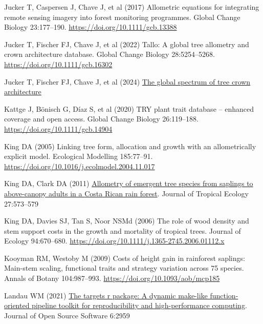 \documentclass[
  12pt,
  letterpaper,
  DIV=11,
  numbers=noendperiod]{scrartcl}
\newlength{\cslhangindent}
\newlength{\cslentryspacingunit} %
\newenvironment{CSLReferences}[2] %
 {%
  \setlength{\parindent}{0pt}
  \ifodd #1
  \let\oldpar\par
  \def\par{\hangindent=\cslhangindent\oldpar}
  \fi
  \setlength{\parskip}{#2\cslentryspacingunit}
 }%
 {}
\begin{document}
\begin{CSLReferences}{1}{0}
\leavevmode{}%
Jucker T, Caspersen J, Chave J, et al (2017) Allometric equations for
integrating remote sensing imagery into forest monitoring programmes.
Global Change Biology 23:177--190.
\url{https://doi.org/10.1111/gcb.13388}

\leavevmode{}%
Jucker T, Fischer FJ, Chave J, et al (2022) Tallo: {A} global tree
allometry and crown architecture database. Global Change Biology
28:5254--5268. \url{https://doi.org/10.1111/gcb.16302}

\leavevmode{}%
Jucker T, Fischer FJ, Chave J, et al (2024)
\href{https://doi.org/10.1101/2024.09.14.613032}{The global spectrum of
tree crown architecture}

\leavevmode{}%
Kattge J, Bönisch G, Díaz S, et al (2020) {TRY} plant trait database --
enhanced coverage and open access. Global Change Biology 26:119--188.
\url{https://doi.org/10.1111/gcb.14904}

\leavevmode{}%
King DA (2005) Linking tree form, allocation and growth with an
allometrically explicit model. Ecological Modelling 185:77--91.
\url{https://doi.org/10.1016/j.ecolmodel.2004.11.017}

\leavevmode{}%
King DA, Clark DA (2011)
\href{https://www.jstor.org/stable/23012404}{Allometry of emergent tree
species from saplings to above-canopy adults in a {Costa} {Rican} rain
forest}. Journal of Tropical Ecology 27:573--579

\leavevmode{}%
King DA, Davies SJ, Tan S, Noor NSMd (2006) The role of wood density and
stem support costs in the growth and mortality of tropical trees.
Journal of Ecology 94:670--680.
\url{https://doi.org/10.1111/j.1365-2745.2006.01112.x}

\leavevmode{}%
Kooyman RM, Westoby M (2009) Costs of height gain in rainforest
saplings: Main-stem scaling, functional traits and strategy variation
across 75 species. Annals of Botany 104:987--993.
\url{https://doi.org/10.1093/aob/mcp185}

\leavevmode{}%
Landau WM (2021) \href{https://doi.org/10.21105/joss.02959}{The targets
r package: A dynamic make-like function-oriented pipeline toolkit for
reproducibility and high-performance computing}. Journal of Open Source
Software 6:2959


\end{CSLReferences}
\end{document}
